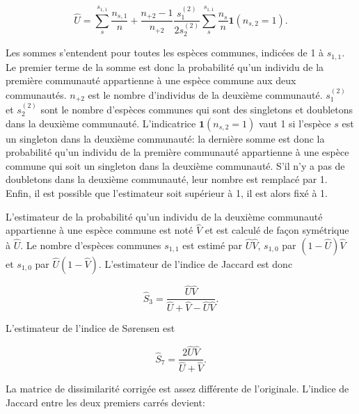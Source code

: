 \documentclass[
  11pt,
  french,
  a4paper,
  extrafontsizes,onecolumn,openright
  ]{memoir}
\begin{document}
\begin{equation}
  \label{eq:Chao2004a}
  \hat{U} = \sum_{s}^{s_{1,1}}{\frac{n_{s,1}}{n}} + \frac{n_{+2}-1}{n_{+2}} \frac{s_1^{(2)}}{2 s_2^{(2)}} \sum_{s}^{s_{1,1}}{\frac{n_s}{n}{\mathbf 1}\left( n_{s,2}=1 \right)}.
\end{equation}

Les sommes s'entendent pour toutes les espèces communes, indicées de 1 à \(s_{1,1}\).
Le premier terme de la somme est donc la probabilité qu'un individu de la première communauté appartienne à une espèce commune aux deux communautés.
\(n_{+2}\) est le nombre d'individus de la deuxième communauté.
\(s_1^{(2)}\) et \(s_2^{(2)}\) sont le nombre d'espèces communes qui sont des singletons et doubletons dans la deuxième communauté.
L'indicatrice \({\mathbf 1}(n_{s,2}=1)\) vaut 1 si l'espèce \(s\) est un singleton dans la deuxième communauté: la dernière somme est donc la probabilité qu'un individu de la première communauté appartienne à une espèce commune qui soit un singleton dans la deuxième communauté.
S'il n'y a pas de doubletons dans la deuxième communauté, leur nombre est remplacé par 1.
Enfin, il est possible que l'estimateur soit supérieur à 1, il est alors fixé à 1.

L'estimateur de la probabilité qu'un individu de la deuxième communauté appartienne à une espèce commune est noté \(\hat{V}\) et est calculé de façon symétrique à \(\hat{U}\).
Le nombre d'espèces communes \(s_{1,1}\) est estimé par \(\hat{U}\hat{V}\), \(s_{1,0}\) par \((1-\hat{U})\hat{V}\) et \(s_{1,0}\) par \(\hat{U}(1-\hat{V})\).
L'estimateur de l'indice de Jaccard est donc

\begin{equation}
  \label{eq:EstS3}
  \hat{S}_3 = \frac{\hat{U}\hat{V}}{\hat{U}+\hat{V}-\hat{U}\hat{V}}.
\end{equation}

L'estimateur de l'indice de Sørensen est

\begin{equation}
  \label{eq:EstS7}
  \hat{S}_7 = \frac{2\hat{U}\hat{V}}{\hat{U}+\hat{V}}.
\end{equation}

La matrice de dissimilarité corrigée est assez différente de l'originale. L'indice de Jaccard entre les deux premiers carrés devient:

\scriptsize
\end{document}
